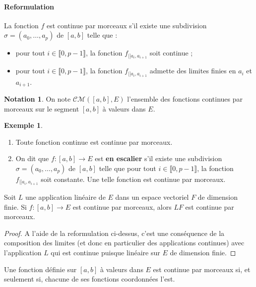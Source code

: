 \documentclass[french]{article}
\theoremstyle{plain}
\theoremstyle{definition}
\newtheorem*{ex}{Exemple}
\newtheorem*{notation}{Notation}
\theoremstyle{remark}
\begin{document}
\paragraph{Reformulation} La fonction $f$ est continue par morceaux s'il existe une subdivision $\sigma=(a_0,\ldots,a_p)$ de $[a,b]$ telle que :
\begin{itemize}
	\item pour tout $i\in\llbracket0,p-1\rrbracket$, la fonction $f_{\mid]a_i,a_{i+1}}$ soit continue ;
	\item pour tout $i\in\llbracket0,p-1\rrbracket$, la fonction $f_{\mid]a_i,a_{i+1}}$ admette des limites finies en $a_i$ et $a_{i+1}$.
\end{itemize}

\begin{notation}
	On note $\mathcal{CM}([a,b],E)$ l'ensemble des fonctions continues par morceaux sur le segment $[a,b]$ à valeurs dans $E$.
\end{notation}

\begin{ex}
	\begin{enumerate}
		\item Toute fonction continue est continue par morceaux.
		\item On dit que $f:[a,b]\to E$ est \textbf{en escalier} s'il existe une subdivision $\sigma=(a_0,\ldots,a_p)$ de $[a,b]$ telle que pour tout $i\in\llbracket0,p-1\rrbracket$, la fonction $f_{\mid]a_i,a_{i+1}}$ soit constante. Une telle fonction est continue par morceaux.
	\end{enumerate}
\end{ex}

\begin{prop}%
	Soit $L$ une application linéaire de $E$ dans un espace vectoriel $F$ de dimension finie. Si $f:[a,b]\to E$ est continue par morceaux, alors $LF$ est continue par morceaux.
\end{prop}
\begin{proof}
	A l'aide de la reformulation ci-dessus, c'est une conséquence de la composition des limites (et donc en particulier des applications continues) avec l'application $L$ qui est continue puisque linéaire sur $E$ de dimension finie.
\end{proof}

\begin{cor}%
	Une fonction définie sur $[a,b]$ à valeurs dans $E$ est continue par morceaux si, et seulement si, chacune de ses fonctions coordonnées l'est.
\end{cor}
\end{document}
